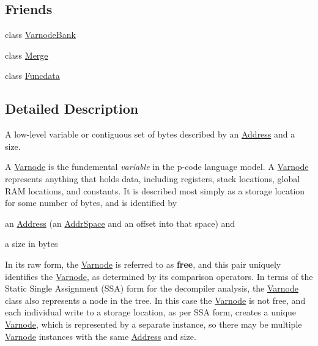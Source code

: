 \subsection*{Friends}
\begin{DoxyCompactItemize}
\item 
class \mbox{\hyperlink{class_varnode_a794a269a99c505d3cd54abc16c456e0d}{Varnode\+Bank}}
\item 
class \mbox{\hyperlink{class_varnode_ada039d79291c7baead36ca12c2f1737b}{Merge}}
\item 
class \mbox{\hyperlink{class_varnode_a16ade990887167c11c41cb88121bb449}{Funcdata}}
\end{DoxyCompactItemize}


\subsection{Detailed Description}
A low-\/level variable or contiguous set of bytes described by an \mbox{\hyperlink{class_address}{Address}} and a size. 

A \mbox{\hyperlink{class_varnode}{Varnode}} is the fundemental {\itshape variable} in the p-\/code language model. A \mbox{\hyperlink{class_varnode}{Varnode}} represents anything that holds data, including registers, stack locations, global R\+AM locations, and constants. It is described most simply as a storage location for some number of bytes, and is identified by
\begin{DoxyItemize}
\item an \mbox{\hyperlink{class_address}{Address}} (an \mbox{\hyperlink{class_addr_space}{Addr\+Space}} and an offset into that space) and
\item a size in bytes
\end{DoxyItemize}

In its raw form, the \mbox{\hyperlink{class_varnode}{Varnode}} is referred to as {\bfseries{free}}, and this pair uniquely identifies the \mbox{\hyperlink{class_varnode}{Varnode}}, as determined by its comparison operators. In terms of the Static Single Assignment (S\+SA) form for the decompiler analysis, the \mbox{\hyperlink{class_varnode}{Varnode}} class also represents a node in the tree. In this case the \mbox{\hyperlink{class_varnode}{Varnode}} is not free, and each individual write to a storage location, as per S\+SA form, creates a unique \mbox{\hyperlink{class_varnode}{Varnode}}, which is represented by a separate instance, so there may be multiple \mbox{\hyperlink{class_varnode}{Varnode}} instances with the same \mbox{\hyperlink{class_address}{Address}} and size. 

